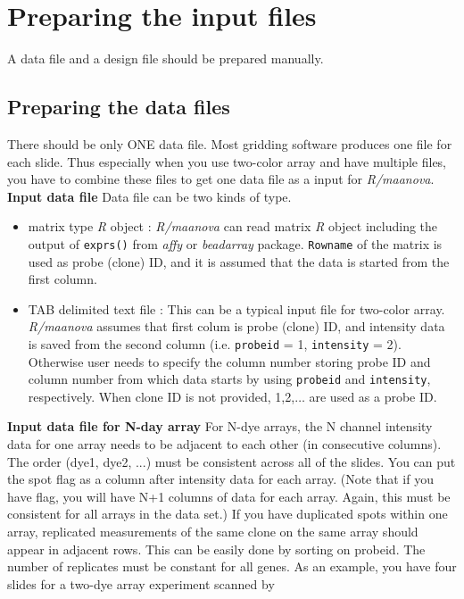 \newpage
\section{Preparing the input files}
A data file and a design file should be prepared manually. 
\subsection{Preparing the data files}
There should be only ONE data file. Most gridding software produces one file
for each slide. Thus especially when you use two-color array and have multiple files, you have to combine these files to get one data file as a input for {\em R/maanova}. \\
{\bf Input data file} Data file can be two kinds of type.
\begin{itemize}
\item matrix type {\em R} object : {\em R/maanova} can read matrix
{\em R} object including the output of {\tt exprs()} from {\em affy} or {\em
beadarray} package. {\tt Rowname} of the matrix is used as probe (clone) ID, and it is assumed that the data is started from the first column. 
\item TAB delimited text file : This can be a typical input file for two-color
array. {\em R/maanova} assumes that first colum is
probe (clone) ID, and intensity data is saved from the second column
(i.e. {\tt probeid} = 1, {\tt intensity} = 2). Otherwise user needs to specify the column number storing
probe ID and column number from which data starts by using {\tt probeid} and {\tt intensity}, respectively. When clone ID is not provided, 1,2,$\ldots$ are used as a probe ID. 
\end{itemize}
{\bf Input data file for N-day array} For N-dye arrays, the N channel intensity data for one array needs to be
adjacent to each other (in consecutive columns). The order (dye1, dye2, ...)
must be consistent across all of the slides. You can put the spot flag as a
column after intensity data for each array. (Note that if you have flag, you
will have N+1 columns of data for each array. Again, this must be consistent
for all arrays in the data set.) If you have duplicated spots 
within one array, replicated measurements of the same clone on the same array
should appear in adjacent rows. This can be easily done by sorting on
probeid. The number of replicates must be constant for all genes. As an
example, you have four slides for a two-dye array experiment scanned by
